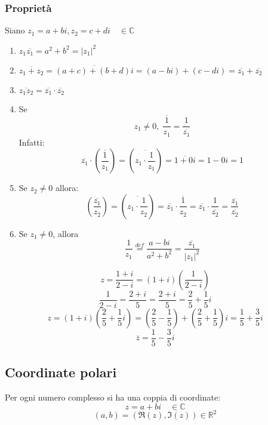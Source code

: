\documentclass[a4paper]{article}
\theoremstyle{break}
\theoremstyle{break}
\theoremstyle{break}
\theoremstyle{break}
\begin{document}
\subsubsection{Proprietà}
Siano \( z_1 = a + bi, z_2 = c + di \quad \in \mathbb{C} \)
\begin{enumerate}
  \item \( z_1 \overline{z_1} = a^2 + b^2 = |z_1|^2 \)
  \item \( \overline{z_1 + z_2} = \overline{(a+c) + (b+d)i} = (a-bi) + (c-di) = \overline{z_1} + \overline{z_2} \)
  \item \( \overline{z_1 z_2} = \overline{z_1} \cdot \overline{z_2} \)
  \item Se \[ z_1 \neq 0, \; \overline{\frac{1}{z_1}} = \frac{1}{\overline{z_1}} \]
    Infatti:
    \[
      \overline{z_1} \cdot \left( \overline{\frac{1}{z_1}} \right) = \left(\overline{ z_1 \cdot \frac{1}{z_1}} \right) = \overline{1+0i} = 1 - 0i = 1
    \]
  \item Se \( z_2 \neq 0 \) allora:
    \[
      \left( \overline{\frac{z_1}{z_2}} \right) = \left( \overline{z_1 \cdot \frac{1}{z_2}} \right) = \overline{z_1} \cdot \overline{\frac{1}{z_2}} = \overline{z_1} \cdot \frac{1}{\overline{z_2}} = \frac{\overline{z_1}}{\overline{z_2}}
    \]
  \item Se \( z_1 \neq 0 \), allora
    \[
      \frac{1}{z_1} \stackrel{def}{=} \frac{a-bi}{a^2+b^2}= \frac{\overline{z_1}}{|z_1|^2}
    \]
\end{enumerate}

\begin{example}
  \[
    z = \frac{1 + i}{2 - i} = \left( 1+i \right) \left( \frac{1}{2-i} \right)
  \]
  \[
    \frac{1}{2-i} = \frac{2+i}{5} = \frac{2+i}{5} = \frac{2}{5} + \frac{1}{5}i
  \]
  \[
    z = \left( 1+i \right) \left( \frac{2}{5} + \frac{1}{5}i \right) = \left( \frac{2}{5}-\frac{1}{5} \right) + \left( \frac{2}{5} + \frac{1}{5} \right)i = \frac{1}{5} + \frac{3}{5}i
  \]
  \[
    \overline{z} = \frac{1}{5} - \frac{3}{5}i
  \]
\end{example}

\subsection{Coordinate polari}
Per ogni numero complesso si ha una coppia di coordinate:
\[
  z = a + bi \quad \in \mathbb{C}
\]
\[ (a,b) = (\Re(z), \Im(z)) \in \mathbb{R}^2 \]
\end{document}
